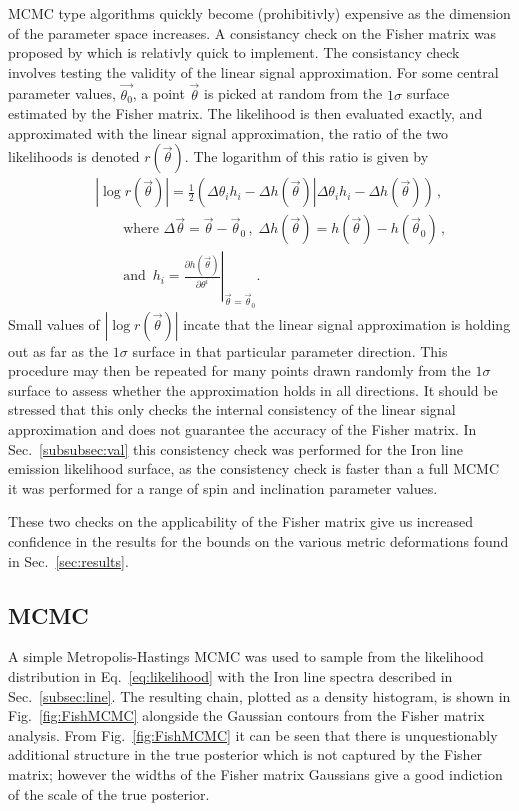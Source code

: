 MCMC type algorithms quickly become (prohibitivly) expensive as the dimension of the parameter space increases. A consistancy check on the Fisher matrix was proposed by \cite{Vallisneri} which is relativly quick to implement. The consistancy check involves testing the validity of the linear signal approximation. For some central parameter values, $\vec{\theta_{0}}$, a point $\vec{\theta}$ is picked at random from the $1\sigma$ surface estimated by the Fisher matrix. The likelihood is then evaluated exactly, and approximated with the linear signal approximation, the ratio of the two likelihoods is denoted $r(\vec{\theta})$. The logarithm of this ratio is given by
\begin{eqnarray}\label{eq:val} 
&&\left| \log   r(\vec{\theta}) \right| =\frac{1}{2}\left.\left(\Delta\theta_{i}h_{i}-\Delta h(\vec{\theta})\right\vert\Delta\theta_{i}h_{i}-\Delta h(\vec{\theta})\right) \, ,\nonumber\\
&&\quad\quad\textrm{where }\Delta\vec{\theta}=\vec{\theta}-\vec{\theta}_{0}\,,\; \Delta h (\vec{\theta})=h(\vec{\theta})-h(\vec{\theta}_{0})\,,\nonumber \\
&&\quad\quad\textrm{and }\, h_{i}=\left.\frac{\partial h(\vec{\theta})}{\partial \theta^{i}}\right|_{\vec{\theta}=\vec{\theta}_{0}} .\end{eqnarray}
Small values of $|\log r(\vec{\theta})|$ incate that the linear signal approximation is holding out as far as the $1\sigma$ surface in that particular parameter direction. This procedure may then be repeated for many points drawn randomly from the $1\sigma$ surface to assess whether the approximation holds in all directions. It should be stressed that this only checks the internal consistency of the linear signal approximation and does not guarantee the accuracy of the Fisher matrix. In Sec.\ \ref{subsubsec:val} this consistency check was performed for the Iron line emission likelihood surface, as the consistency check is faster than a full MCMC it was performed for a range of spin and inclination parameter values.

These two checks on the applicability of the Fisher matrix give us increased confidence in the results for the bounds on the various metric deformations found in Sec.~\ref{sec:results}.

\subsection{MCMC}\label{subsubsec:MCMC}
A simple Metropolis-Hastings MCMC was used to sample from the likelihood distribution in Eq.\ \ref{eq:likelihood} with the Iron line spectra described in Sec.\ \ref{subsec:line}. The resulting chain, plotted as a density histogram, is shown in Fig.\ \ref{fig:FishMCMC} alongside the Gaussian contours from the Fisher matrix analysis. From Fig.\ \ref{fig:FishMCMC} it can be seen that there is unquestionably additional structure in the true posterior which is not captured by the Fisher matrix; however the widths of the Fisher matrix Gaussians give a good indiction of the scale of the true posterior.

